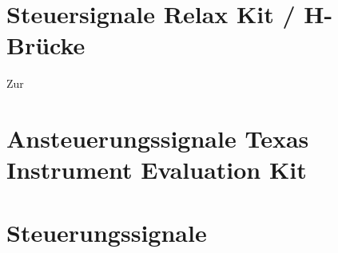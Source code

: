 \section{Steuersignale Relax Kit / H-Brücke}
Zur 



\section{Ansteuerungssignale Texas Instrument Evaluation Kit}

\section{Steuerungssignale }